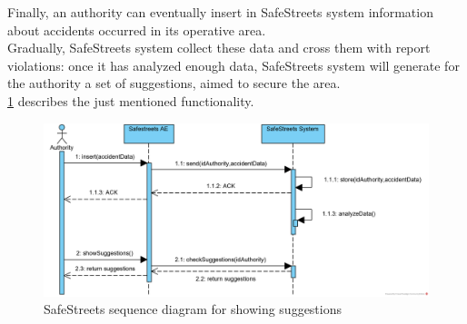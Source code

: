 \documentclass{article}
\begin{document}
			Finally, an authority can eventually insert in SafeStreets system information about accidents occurred in its operative area.\\
			Gradually, SafeStreets system collect these data and cross them with report violations: once it has analyzed enough data, SafeStreets system will generate for the authority a set of suggestions, aimed to secure the area. \\
			\figurename{ \ref{fig:sequencediagram_suggestions}} describes the just mentioned functionality.
			
			\begin{figure}[H]
				\centering
				\includegraphics[width=1.1\textwidth]{diagrams/sequence_suggestions.png}
				\caption[SafeStreets sequence diagram]{SafeStreets sequence diagram for showing suggestions}
				\label{fig:sequencediagram_suggestions}
			\end{figure}
			
			
			
			\clearpage
\end{document}
